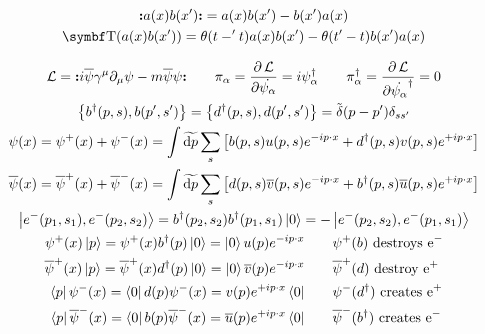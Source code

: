 \begin{gather*}
        \nord{a(x)b(x')} = a(x)b(x') - b(x')a(x)
        \\
        \Tordp(a(x)b(x')) = \theta(t-'t)a(x)b(x') - \theta(t'-t)b(x')a(x)
\end{gather*}

\begin{gather*}
        \Lc = \nord{i\overline{\psi}\gamma^\mu\partial_\mu\psi - m\overline{\psi}\psi}
        \qquad
        \pi_\alpha = \pdv{\Lc}{\dot{\psi_\alpha}} = i\psi_\alpha^\dagger
        \qquad
        \pi_\alpha^\dagger = \pdv{\Lc}{\dot{\psi_\alpha}^\dagger} = 0
        \\
        \acomm{b^\dagger\qty(p,s)}{b\qty(p',s')}
        = \acomm{d^\dagger\qty(p,s)}{d\qty(p',s')}
        = \Tdelta(p-p')\delta_{ss'}
        \\
        \psi(x)
        = \psi^+(x) + \psi^-(x)
        = \int\Tdd{p}\sum_s \qty[b(p,s)u(p,s)e^{-ip\cdot x} + d^\dagger(p,s)v(p,s)e^{+ip\cdot x}]
        \\
        \overline{\psi}(x)
        = \overline{\psi}^+(x) + \overline{\psi}^-(x)
        = \int\Tdd{p}\sum_s \qty[d(p,s)\overline{v}(p,s)e^{-ip\cdot x} + b^\dagger(p,s)\overline{u}(p,s)e^{+ip\cdot x}]
        \\
        \ket{e^-(p_1,s_1),e^-(p_2,s_2)} = b^\dagger(p_2,s_2)b^\dagger(p_1,s_1)\ket{0} = -\ket{e^-(p_2,s_2),e^-(p_1,s_1)}
        \\
        \begin{aligned}
                \psi^+(x)\ket{p} = \psi^+(x)b^\dagger(p)\ket{0} = \ket{0} u(p)e^{-ip\cdot x}
                &\qquad
                \psi^+(b) \text{ destroys } \ce{e^-}
                \\
                \overline{\psi}^+(x)\ket{p} = \overline{\psi}^+(x)d^\dagger(p)\ket{0} = \ket{0} \overline{v}(p)e^{-ip\cdot x}
                &\qquad
                \overline{\psi}^+(d) \text{ destroy } \ce{e^+}
                \\
                \bra{p}\psi^-(x) = \bra{0}d(p)\psi^-(x) = v(p)e^{+ip\cdot x}\bra{0}
                &\qquad
                \psi^-(d^\dagger) \text{ creates } \ce{e^+}
                \\
                \bra{p}\overline{\psi}^-(x) = \bra{0}b(p)\overline{\psi}^-(x) = \overline{u}(p)e^{+ip\cdot x}\bra{0}
                &\qquad
                \overline{\psi}^-(b^\dagger) \text{ creates } \ce{e^-}
        \end{aligned}
\end{gather*}
